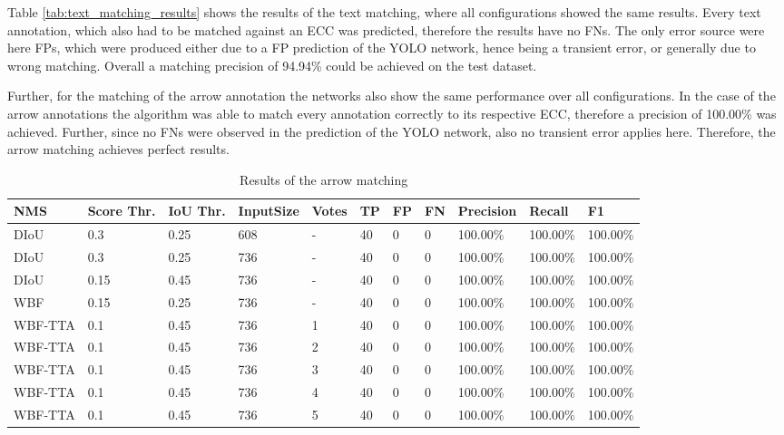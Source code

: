 Table \ref{tab:text_matching_results} shows the results of the text matching, where all configurations showed the same results.
Every text annotation, which also had to be matched against an \ac{ECC} was predicted, therefore the results have no \acp{FN}.
The only error source were here \acp{FP}, which were produced either due to a \ac{FP} prediction of the \ac{YOLO} network, hence being a transient error, or generally due to wrong matching.
Overall a matching precision of 94.94\% could be achieved on the test dataset.


Further, for the matching of the arrow annotation the networks also show the same performance over all configurations.
In the case of the arrow annotations the algorithm was able to match every annotation correctly to its respective \ac{ECC}, therefore a precision of 100.00\% was achieved.
Further, since no \acp{FN} were observed in the prediction of the \ac{YOLO} network, also no transient error applies here.
Therefore, the arrow matching achieves perfect results.

\begin{table}[H]
\footnotesize
\begin{center}
\begin{tabular}{|l|l|l|l|l|l|l|l|l|l|l|}

\hline
\textbf{NMS}     & \textbf{Score Thr.} & \textbf{IoU Thr.} & \textbf{InputSize} & \textbf{Votes} & \textbf{TP}  & \textbf{FP} & \textbf{FN} & \textbf{Precision} & \textbf{Recall}   & \textbf{F1}       \\
\hline
DIoU    & 0.3        & 0.25     & 608        & -     & 40  & 0  & 0  & 100.00\%  & 100.00\% & 100.00\%  \\
\hline
DIoU    & 0.3        & 0.25     & 736        & -     & 40  & 0  & 0  & 100.00\%  & 100.00\% & 100.00\%  \\
\hline
DIoU    & 0.15       & 0.45     & 736        & -     & 40  & 0  & 0  & 100.00\%  & 100.00\% & 100.00\%  \\
\hline
WBF     & 0.15       & 0.25     & 736        & -     & 40  & 0  & 0  & 100.00\%  & 100.00\% & 100.00\%  \\
\hline
WBF-TTA & 0.1        & 0.45     & 736        & 1     & 40  & 0  & 0  & 100.00\%  & 100.00\% & 100.00\%  \\
\hline
WBF-TTA & 0.1        & 0.45     & 736        & 2     & 40  & 0  & 0  & 100.00\%  & 100.00\% & 100.00\%  \\
\hline
WBF-TTA & 0.1        & 0.45     & 736        & 3     & 40  & 0  & 0  & 100.00\%  & 100.00\% & 100.00\%  \\
\hline
WBF-TTA & 0.1        & 0.45     & 736        & 4     & 40  & 0  & 0  & 100.00\%  & 100.00\% & 100.00\%  \\
\hline
WBF-TTA & 0.1        & 0.45     & 736        & 5     & 40  & 0  & 0  & 100.00\%  & 100.00\% & 100.00\%  \\
\hline

\end{tabular}
\caption{Results of the arrow matching}
\label{tab:arrow_matching_results}
\end{center}
\end{table}

